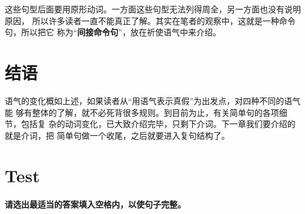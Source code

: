 这些句型后面要用原形动词。一方面这些句型无法列得周全，另一方面也没有说明原因，
所以许多读者一直不能真正了解。其实在笔者的观察中，这就是一种命令句，所以把它
称为“\textbf{间接命令句}”，放在祈使语气中来介绍。

\section{结语}

语气的变化概如上述，如果读者从“用语气表示真假”为出发点，对四种不同的语气能
够有整体的了解，就不必死背很多规则。到目前为止，有关简单句的各项细节，包括复
杂的动词变化，已大致介绍完毕，只剩下介词。下一章我们要介绍的就是介词，把
简单句做一个收尾，之后就要进入复句结构了。

\section{Test}

\paragraph{请选出最适当的答案填入空格内，以使句子完整。}

